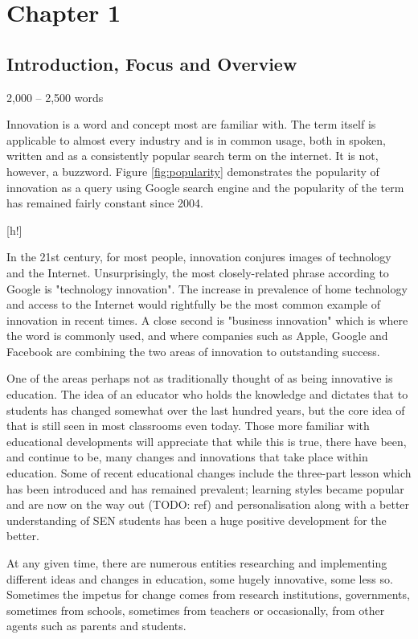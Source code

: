 \section{Chapter 1}
\subsection{Introduction, Focus and Overview}
2,000 – 2,500 words\citep{Frame61:online}

Innovation is a word and concept most are familiar with. The term itself is applicable to almost every industry and is in common usage, both in spoken, written and as a consistently popular search term on the internet. \cite{CorpusofContemporaryAmericanEnglish, Google} It is not, however, a buzzword. Figure \ref{fig:popularity} demonstrates the popularity of innovation as a query using Google search engine and the popularity of the term has remained fairly constant since 2004.

[h!]

In the 21st century, for most people, innovation conjures images of technology and the Internet. Unsurprisingly, the most closely-related phrase according to Google is "technology innovation". \cite{Google} The increase in prevalence of home technology and access to the Internet would rightfully be the most common example of innovation in recent times. A close second is "business innovation" which is where the word is commonly used, and where companies such as Apple, Google and Facebook are combining the two areas of innovation to outstanding success.

One of the areas perhaps not as traditionally thought of as being innovative is education. The idea of an educator who holds the knowledge and dictates that to students has changed somewhat over the last hundred years, but the core idea of that is still seen in most classrooms even today. Those more familiar with educational developments will appreciate that while this is true, there have been, and continue to be, many changes and innovations that take place within education. Some of recent educational changes include the three-part lesson which has been introduced and has remained prevalent; learning styles became popular and are now on the way out (TODO: ref) and personalisation along with a better understanding of SEN students has been a huge positive development for the better.

At any given time, there are numerous entities researching and implementing different ideas and changes in education, some hugely innovative, some less so. Sometimes the impetus for change comes from research institutions, governments, sometimes from schools, sometimes from teachers or occasionally, from other agents such as parents and students. 

